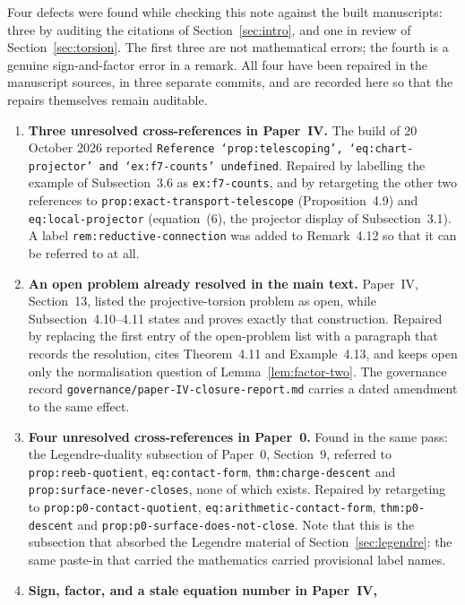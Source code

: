 Four defects were found while checking this note against the built manuscripts:
three by auditing the citations of Section~\ref{sec:intro}, and one in review of
Section~\ref{sec:torsion}.  The first three are not mathematical errors; the
fourth is a genuine sign-and-factor error in a remark.  All four have been
repaired in the manuscript sources, in three separate commits, and are recorded
here so that the repairs themselves remain auditable.

\begin{enumerate}[label=(\alph*)]
  \item \textbf{Three unresolved cross-references in Paper~IV.}  The build of
  20 October 2026 reported
  \texttt{Reference `prop:telescoping', `eq:chart-projector' and
  `ex:f7-counts' undefined}.  Repaired by labelling the example of
  Subsection~3.6 as \texttt{ex:f7-counts}, and by retargeting the other two
  references to \texttt{prop:exact-transport-telescope} (Proposition~4.9) and
  \texttt{eq:local-projector} (equation~(6), the projector display of
  Subsection~3.1).  A label \texttt{rem:reductive-connection} was added to
  Remark~4.12 so that it can be referred to at all.
  \item \textbf{An open problem already resolved in the main text.}
  Paper~IV, Section~13, listed the projective-torsion problem as open, while
  Subsection~4.10--4.11 states and proves exactly that construction.  Repaired
  by replacing the first entry of the open-problem list with a paragraph that
  records the resolution, cites Theorem~4.11 and Example~4.13, and keeps open
  only the normalisation question of Lemma~\ref{lem:factor-two}.  The
  governance record \texttt{governance/paper-IV-closure-report.md} carries a
  dated amendment to the same effect.
  \item \textbf{Four unresolved cross-references in Paper~0.}  Found in the same
  pass: the Legendre-duality subsection of Paper~0, Section~9, referred to
  \texttt{prop:reeb-quotient}, \texttt{eq:contact-form},
  \texttt{thm:charge-descent} and \texttt{prop:surface-never-closes}, none of
  which exists.  Repaired by retargeting to
  \texttt{prop:p0-contact-quotient}, \texttt{eq:arithmetic-contact-form},
  \texttt{thm:p0-descent} and \texttt{prop:p0-surface-does-not-close}.  Note
  that this is the subsection that absorbed the Legendre material of
  Section~\ref{sec:legendre}: the same paste-in that carried the mathematics
  carried provisional label names.
  \item \textbf{Sign, factor, and a stale equation number in Paper~IV,
}
\end{enumerate}
